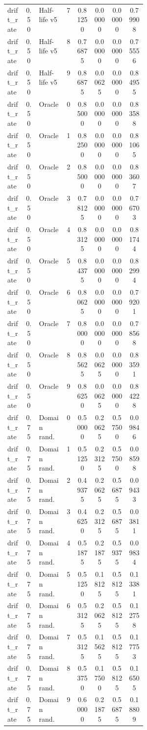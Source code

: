 \documentclass{article}
\begin{document}
\begin{center}
\begin{longtable}{p{0.13\linewidth}cp{0.20\linewidth}ccccc}
drift\_rate & 0.50 & Half-life v5 & 7 & 0.81250 & 0.00000 & 0.00000 & 0.79908\\
drift\_rate & 0.50 & Half-life v5 & 8 & 0.76875 & 0.00000 & 0.00000 & 0.75556\\
drift\_rate & 0.50 & Half-life v5 & 9 & 0.86875 & 0.00625 & 0.00000 & 0.84955\\
drift\_rate & 0.50 & Oracle & 0 & 0.85000 & 0.00000 & 0.00000 & 0.83588\\
drift\_rate & 0.50 & Oracle & 1 & 0.82500 & 0.00000 & 0.00000 & 0.81065\\
drift\_rate & 0.50 & Oracle & 2 & 0.85000 & 0.00000 & 0.00000 & 0.83607\\
drift\_rate & 0.50 & Oracle & 3 & 0.78125 & 0.00000 & 0.00000 & 0.76703\\
drift\_rate & 0.50 & Oracle & 4 & 0.83125 & 0.00000 & 0.00000 & 0.81744\\
drift\_rate & 0.50 & Oracle & 5 & 0.84375 & 0.00000 & 0.00000 & 0.82994\\
drift\_rate & 0.50 & Oracle & 6 & 0.80625 & 0.00000 & 0.00000 & 0.79201\\
drift\_rate & 0.50 & Oracle & 7 & 0.80000 & 0.00000 & 0.00000 & 0.78568\\
drift\_rate & 0.50 & Oracle & 8 & 0.85625 & 0.00625 & 0.00000 & 0.83591\\
drift\_rate & 0.50 & Oracle & 9 & 0.86250 & 0.00625 & 0.00000 & 0.84228\\
drift\_rate & 0.75 & Domain rand. & 0 & 0.50000 & 0.20625 & 0.57500 & 0.09846\\
drift\_rate & 0.75 & Domain rand. & 1 & 0.51250 & 0.23125 & 0.57500 & 0.08598\\
drift\_rate & 0.75 & Domain rand. & 2 & 0.49375 & 0.20625 & 0.56875 & 0.09433\\
drift\_rate & 0.75 & Domain rand. & 3 & 0.46250 & 0.23125 & 0.56875 & 0.03811\\
drift\_rate & 0.75 & Domain rand. & 4 & 0.51875 & 0.21875 & 0.59375 & 0.09834\\
drift\_rate & 0.75 & Domain rand. & 5 & 0.51250 & 0.18125 & 0.58125 & 0.13381\\
drift\_rate & 0.75 & Domain rand. & 6 & 0.53125 & 0.20625 & 0.58125 & 0.12758\\
drift\_rate & 0.75 & Domain rand. & 7 & 0.53125 & 0.15625 & 0.58125 & 0.17753\\
drift\_rate & 0.75 & Domain rand. & 8 & 0.53750 & 0.17500 & 0.58125 & 0.16505\\
drift\_rate & 0.75 & Domain rand. & 9 & 0.60000 & 0.21875 & 0.56875 & 0.18809\\

\end{longtable}
\end{center}
\end{document}
